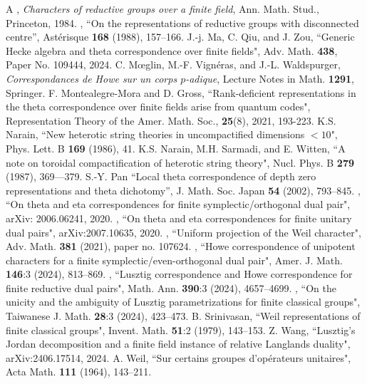 \documentclass[12pt]{amsart}
\numberwithin{equation}{subsection}
\begin{document}
\begin{thebibliography}{A}
 \bysame, \textit{Characters of reductive groups over a finite field}, Ann. Math. Stud., Princeton, 1984.
 \bysame, ``On the representations of reductive groups with disconnected centre”, Astérisque \textbf{168} (1988), 157--166.
 J.-j. Ma, C. Qiu, and J. Zou, ``Generic Hecke algebra and theta correspondence over finite fields",  Adv. Math. \textbf{438}, Paper No. 109444, 2024.
 C. M{\oe}glin,  M.-F. Vignéras, and J.-L. Waldspurger, \textit{Correspondances de Howe sur un corps $p$-adique}, Lecture Notes in Math. \textbf{1291}, Springer.
 F. Montealegre-Mora and D. Gross, ``Rank-deficient representations in the theta correspondence over finite fields arise from
quantum codes", Representation Theory of the Amer. Math. Soc., \textbf{25}(8), 2021, 193-223.
 K.S. Narain, ``New heterotic string theories in uncompactified dimensions $<10$", Phys. Lett. B \textbf{169} (1986), 41.
 K.S. Narain, M.H. Sarmadi, and E. Witten, ``A note on toroidal compactification of heterotic string theory", Nucl. Phys. B \textbf{279} (1987), 369---379.
 S.-Y. Pan ``Local theta correspondence of depth zero representations and theta dichotomy'', J. Math. Soc. Japan \textbf{54} (2002), 793--845.
 \bysame, ``On theta and eta correspondences for finite symplectic/or\-tho\-go\-nal dual pair", arXiv: 2006.06241, 2020.
 \bysame, ``On theta and eta correspondences for finite unitary dual pairs", arXiv:2007.10635, 2020.
  \bysame, ``Uniform projection of the Weil character", Adv. Math. \textbf{381} (2021), paper no. 107624.
 \bysame, ``Howe correspondence of unipotent characters for a finite symplectic/even-orthogonal dual pair", Amer. J. Math. \textbf{146}:3 (2024), 813--869.
 \bysame, ``Lusztig correspondence and Howe correspondence for finite reductive dual pairs", Math. Ann. \textbf{390}:3 (2024), 4657--4699.
 \bysame, ``On the unicity and the ambiguity of Lusztig parametrizations for finite classical groups", Taiwanese J. Math. \textbf{28}:3 (2024), 423--473.
 B. Srinivasan, ``Weil representations of finite classical groups", Invent. Math. \textbf{51}:2 (1979), 143--153. 
 Z. Wang, ``Lusztig's Jordan decomposition and a finite field instance of relative Langlands duality", arXiv:2406.17514, 2024.
 A. Weil, ``Sur certains groupes d’op\'erateurs unitaires", Acta Math. \textbf{111} (1964), 143--211.
\end{thebibliography}
\end{document}
